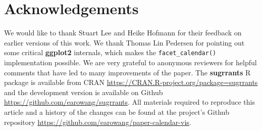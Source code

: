\documentclass[12pt]{article}
\begin{document}
\hypertarget{acknowledgements}{%
\section*{Acknowledgements}\label{acknowledgements}}

We would like to thank Stuart Lee and Heike Hofmann for their feedback on earlier versions of this work. We thank Thomas Lin Pedersen for pointing out some critical \textbf{ggplot2} internals, which makes the \texttt{facet\_calendar()} implementation possible. We are very grateful to anonymous reviewers for helpful comments that have led to many improvements of the paper. The \textbf{sugrrants} R package is available from CRAN \url{https://CRAN.R-project.org/package=sugrrants} and the development version is available on Github \url{https://github.com/earowang/sugrrants}. All materials required to reproduce this article and a history of the changes can be found at the project's Github repository \url{https://github.com/earowang/paper-calendar-vis}.



\end{document}
